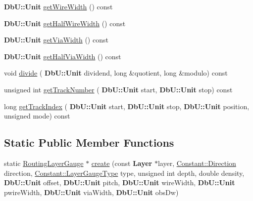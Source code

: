 \begin{DoxyCompactItemize}
\item 
\textbf{ Db\+U\+::\+Unit} \mbox{\hyperlink{classCRL_1_1RoutingLayerGauge_ab29fa7895f4fe661eb85bed9f6a5860e}{get\+Wire\+Width}} () const
\item 
\textbf{ Db\+U\+::\+Unit} \mbox{\hyperlink{classCRL_1_1RoutingLayerGauge_a57183085c39be7edcb87f4f770f8e535}{get\+Half\+Wire\+Width}} () const
\item 
\textbf{ Db\+U\+::\+Unit} \mbox{\hyperlink{classCRL_1_1RoutingLayerGauge_ac0783d29a7f9f6a2f02ac72f3196d637}{get\+Via\+Width}} () const
\item 
\textbf{ Db\+U\+::\+Unit} \mbox{\hyperlink{classCRL_1_1RoutingLayerGauge_a0f090ea25ef6f88e691fc6e572f79e16}{get\+Half\+Via\+Width}} () const
\item 
void \mbox{\hyperlink{classCRL_1_1RoutingLayerGauge_ab8d5ae22c453605226b2695c2568c4f5}{divide}} (\textbf{ Db\+U\+::\+Unit} dividend, long \&quotient, long \&modulo) const
\item 
unsigned int \mbox{\hyperlink{classCRL_1_1RoutingLayerGauge_ab9bbb7959ca58438d59709398044daae}{get\+Track\+Number}} (\textbf{ Db\+U\+::\+Unit} start, \textbf{ Db\+U\+::\+Unit} stop) const
\item 
long \mbox{\hyperlink{classCRL_1_1RoutingLayerGauge_ad61cdf130c8b739bb44a01cfd5968022}{get\+Track\+Index}} (\textbf{ Db\+U\+::\+Unit} start, \textbf{ Db\+U\+::\+Unit} stop, \textbf{ Db\+U\+::\+Unit} position, unsigned mode) const
\end{DoxyCompactItemize}
\subsection*{Static Public Member Functions}
\begin{DoxyCompactItemize}
\item 
static \mbox{\hyperlink{classCRL_1_1RoutingLayerGauge}{Routing\+Layer\+Gauge}} $\ast$ \mbox{\hyperlink{classCRL_1_1RoutingLayerGauge_afb41e7be2a6d258a691aacbe7a78154f}{create}} (const \textbf{ Layer} $\ast$layer, \mbox{\hyperlink{namespaceConstant_ac081a99f2b64361919ed5d9f37c0f9af}{Constant\+::\+Direction}} direction, \mbox{\hyperlink{namespaceConstant_ab2e46a17cc373a268c5c24fa0e2067e5}{Constant\+::\+Layer\+Gauge\+Type}} type, unsigned int depth, double density, \textbf{ Db\+U\+::\+Unit} offset, \textbf{ Db\+U\+::\+Unit} pitch, \textbf{ Db\+U\+::\+Unit} wire\+Width, \textbf{ Db\+U\+::\+Unit} pwire\+Width, \textbf{ Db\+U\+::\+Unit} via\+Width, \textbf{ Db\+U\+::\+Unit} obs\+Dw)
\end{DoxyCompactItemize}


